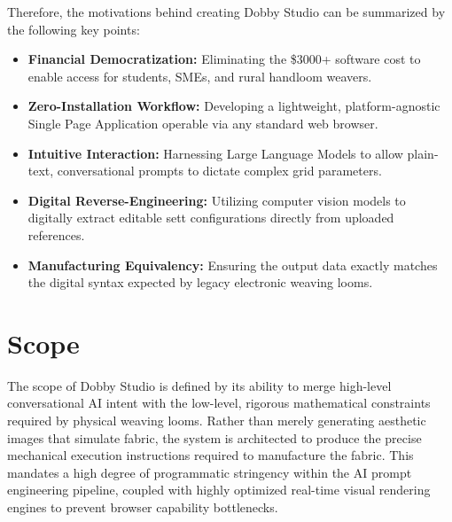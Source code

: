 Therefore, the motivations behind creating Dobby Studio can be summarized by the following key points:
\begin{itemize}
    \item \textbf{Financial Democratization:} Eliminating the \$3000+ software cost to enable access for students, SMEs, and rural handloom weavers.
    \item \textbf{Zero-Installation Workflow:} Developing a lightweight, platform-agnostic Single Page Application operable via any standard web browser.
    \item \textbf{Intuitive Interaction:} Harnessing Large Language Models to allow plain-text, conversational prompts to dictate complex grid parameters.
    \item \textbf{Digital Reverse-Engineering:} Utilizing computer vision models to digitally extract editable sett configurations directly from uploaded references.
    \item \textbf{Manufacturing Equivalency:} Ensuring the output data exactly matches the digital syntax expected by legacy electronic weaving looms.
\end{itemize}

\section{Scope}
The scope of Dobby Studio is defined by its ability to merge high-level conversational AI intent with the low-level, rigorous mathematical constraints required by physical weaving looms. Rather than merely generating aesthetic images that simulate fabric, the system is architected to produce the precise mechanical execution instructions required to manufacture the fabric. This mandates a high degree of programmatic stringency within the AI prompt engineering pipeline, coupled with highly optimized real-time visual rendering engines to prevent browser capability bottlenecks. 

